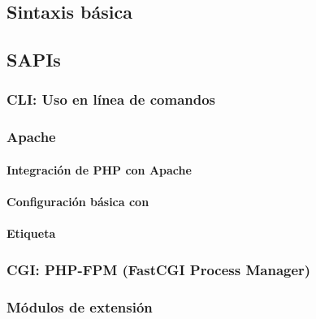 \documentclass[a4paper,11pt,spanish]{sphinxmanual}
\begin{document}
\subsection{Sintaxis básica}
\label{\detokenize{php:sintaxis-basica}}

\subsection{SAPIs}
\label{\detokenize{php:sapis}}

\subsubsection{CLI: Uso en línea de comandos}
\label{\detokenize{php:cli-uso-en-linea-de-comandos}}

\subsubsection{Apache}
\label{\detokenize{php:apache}}

\paragraph{Integración de PHP con Apache}
\label{\detokenize{php:integracion-de-php-con-apache}}

\paragraph{Configuración básica con }
\label{\detokenize{php:configuracion-basica-con-php-ini}}

\paragraph{Etiqueta }
\label{\detokenize{php:etiqueta}}

\subsubsection{CGI: PHP-FPM (FastCGI Process Manager)}
\label{\detokenize{php:cgi-php-fpm-fastcgi-process-manager}}

\subsubsection{Módulos de extensión}
\label{\detokenize{php:modulos-de-extension}}
\end{document}
